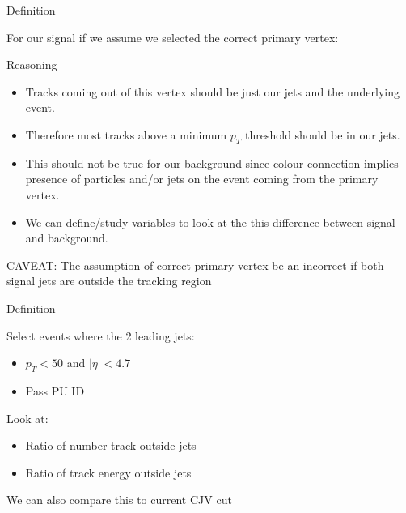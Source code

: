 \documentclass[8pt]{beamer}
\begin{document}
\begin{frame}{Definition}
 
For our signal if we assume we selected the correct primary vertex:
\begin{block}{Reasoning}
 
\begin{itemize}
  \item Tracks coming out of this vertex should be just our jets and the underlying event.
  \item Therefore most tracks above a minimum $p_T$ threshold should be in our jets.
  \item This should not be true for our background since colour connection implies presence of particles and/or jets on the event coming from the primary vertex.
  \item We can define/study variables to look at the this difference between signal and background.
\end{itemize}

CAVEAT: The assumption of correct primary vertex be an incorrect if both signal jets are outside the tracking region
 
\end{block}
 
\begin{block}{Definition} 

Select events where the 2 leading jets:
\begin{itemize}
  \item $p_T<50$ and $|\eta|<4.7$
  \item Pass PU ID
\end{itemize}

Look at:
\begin{itemize}
  \item Ratio of number track outside jets
  \item Ratio of track energy outside jets
\end{itemize}

We can also compare this to current CJV cut

\end{block}

\end{frame}
\end{document}
